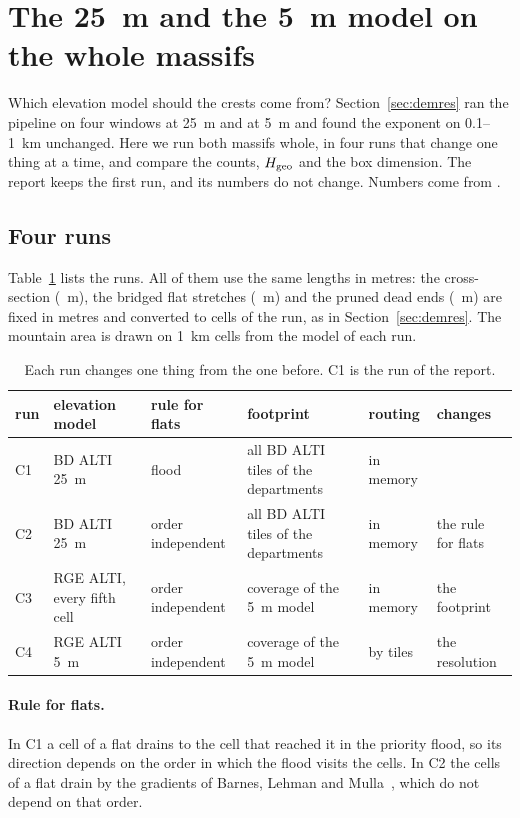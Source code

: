 \section{The 25~m and the 5~m model on the whole massifs}\label{app:dem}

Which elevation model should the crests come from? Section~\ref{sec:demres} ran the pipeline on four windows at 25~m and at 5~m and found the exponent on 0.1--1~km unchanged. Here we run both massifs whole, in four runs that change one thing at a time, and compare the counts, $H_{\mathrm{geo}}$ and the box dimension. The report keeps the first run, and its numbers do not change. Numbers come from .

\subsection{Four runs}

Table~\ref{tab:cdruns} lists the runs. All of them use the same lengths in metres: the cross-section (\DrXsec~m), the bridged flat stretches (\DrBridge~m) and the pruned dead ends (\DrPrune~m) are fixed in metres and converted to cells of the run, as in Section~\ref{sec:demres}. The mountain area is drawn on 1~km cells from the model of each run.

\begin{table}[H]
\centering
\caption{Each run changes one thing from the one before. C1 is the run of the report.}
\label{tab:cdruns}
\small
\begin{tabular}{@{}l p{2.7cm} p{2.3cm} p{3.2cm} p{1.7cm} p{2cm}@{}}
\toprule
run & elevation model & rule for flats & footprint & routing & changes \\
\midrule
C1 & BD ALTI 25~m & flood & all BD ALTI tiles of the departments & in memory & \\
C2 & BD ALTI 25~m & order independent & all BD ALTI tiles of the departments & in memory & the rule for flats \\
C3 & RGE ALTI, every fifth cell & order independent & coverage of the 5~m model & in memory & the footprint \\
C4 & RGE ALTI 5~m & order independent & coverage of the 5~m model & by tiles & the resolution \\
\bottomrule
\end{tabular}
\end{table}

\paragraph{Rule for flats.} In C1 a cell of a flat drains to the cell that reached it in the priority flood, so its direction depends on the order in which the flood visits the cells. In C2 the cells of a flat drain by the gradients of Barnes, Lehman and Mulla~\cite{barnesflats}, which do not depend on that order.

